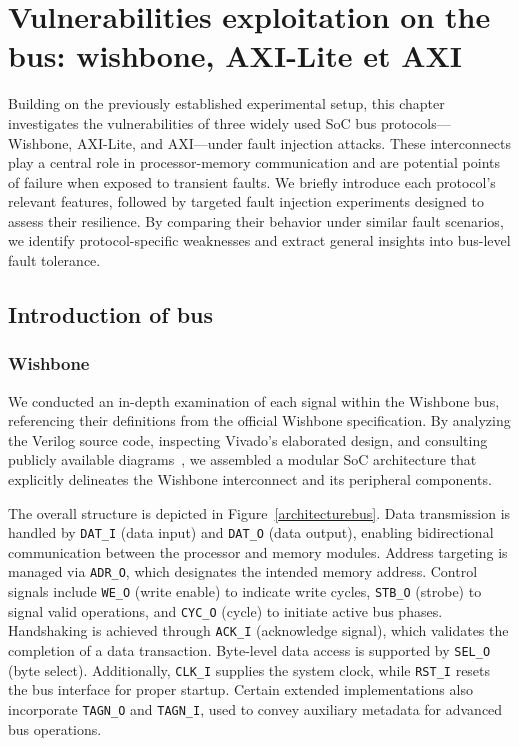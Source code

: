\chapter{Vulnerabilities exploitation on the bus: wishbone, AXI-Lite et AXI}
Building on the previously established experimental setup, this chapter investigates the vulnerabilities of three widely used SoC bus protocols—Wishbone, AXI-Lite, and AXI—under fault injection attacks. These interconnects play a central role in processor-memory communication and are potential points of failure when exposed to transient faults. We briefly introduce each protocol's relevant features, followed by targeted fault injection experiments designed to assess their resilience. By comparing their behavior under similar fault scenarios, we identify protocol-specific weaknesses and extract general insights into bus-level fault tolerance.
\section{Introduction of bus}

\subsection{Wishbone}
We conducted an in-depth examination of each signal within the Wishbone bus, referencing their definitions from the official Wishbone specification. By analyzing the Verilog source code, inspecting Vivado’s elaborated design, and consulting publicly available diagrams~\cite{wishbonewiki}, we assembled a modular SoC architecture that explicitly delineates the Wishbone interconnect and its peripheral components.

The overall structure is depicted in Figure~\ref{architecturebus}. Data transmission is handled by \texttt{DAT\_I} (data input) and \texttt{DAT\_O} (data output), enabling bidirectional communication between the processor and memory modules. Address targeting is managed via \texttt{ADR\_O}, which designates the intended memory address. Control signals include \texttt{WE\_O} (write enable) to indicate write cycles, \texttt{STB\_O} (strobe) to signal valid operations, and \texttt{CYC\_O} (cycle) to initiate active bus phases. Handshaking is achieved through \texttt{ACK\_I} (acknowledge signal), which validates the completion of a data transaction. Byte-level data access is supported by \texttt{SEL\_O} (byte select). Additionally, \texttt{CLK\_I} supplies the system clock, while \texttt{RST\_I} resets the bus interface for proper startup. Certain extended implementations also incorporate \texttt{TAGN\_O} and \texttt{TAGN\_I}, used to convey auxiliary metadata for advanced bus operations.

